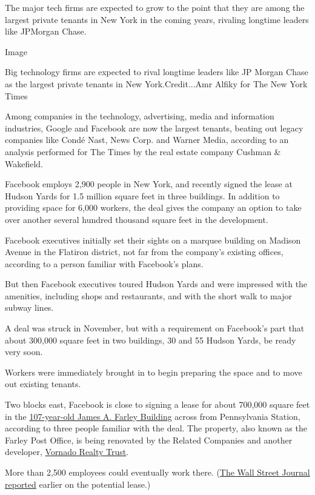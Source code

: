 The major tech firms are expected to grow to the point that they are
among the largest private tenants in New York in the coming years,
rivaling longtime leaders like JPMorgan Chase.

Image

Big technology firms are expected to rival longtime leaders like JP
Morgan Chase as the largest private tenants in New York.Credit...Amr
Alfiky for The New York Times

Among companies in the technology, advertising, media and information
industries, Google and Facebook are now the largest tenants, beating out
legacy companies like Condé Nast, News Corp. and Warner Media, according
to an analysis performed for The Times by the real estate company
Cushman \& Wakefield.

Facebook employs 2,900 people in New York, and recently signed the lease
at Hudson Yards for 1.5 million square feet in three buildings. In
addition to providing space for 6,000 workers, the deal gives the
company an option to take over another several hundred thousand square
feet in the development.

Facebook executives initially set their sights on a marquee building on
Madison Avenue in the Flatiron district, not far from the company's
existing offices, according to a person familiar with Facebook's plans.

But then Facebook executives toured Hudson Yards and were impressed with
the amenities, including shops and restaurants, and with the short walk
to major subway lines.

A deal was struck in November, but with a requirement on Facebook's part
that about 300,000 square feet in two buildings, 30 and 55 Hudson Yards,
be ready very soon.

Workers were immediately brought in to begin preparing the space and to
move out existing tenants.

Two blocks east, Facebook is close to signing a lease for about 700,000
square feet in the
\href{https://www.nytimes3xbfgragh.onion/2017/08/17/nyregion/manhattans-farley-post-office-will-soon-be-a-grand-train-hall.html}{107-year-old
James A. Farley Building} across from Pennsylvania Station, according to
three people familiar with the deal. The property, also known as the
Farley Post Office, is being renovated by the Related Companies and
another developer,
\href{https://www.vno.com/office/property/the-farley-building/3313609/landing}{Vornado
Realty Trust}.

More than 2,500 employees could eventually work there.
(\href{https://www.wsj.com/articles/facebook-in-talks-for-new-york-office-in-deal-making-company-one-of-citys-largest-11575628203?mod=article_inline}{The
Wall Street Journal reported} earlier on the potential lease.)

